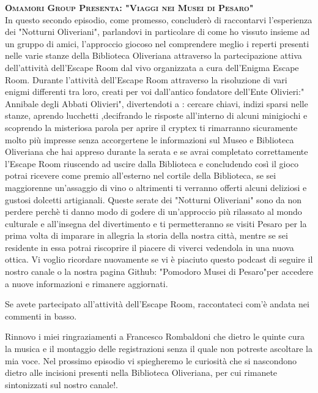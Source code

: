 \documentclass[hidelinks,12pt,a4paper]{article}
\begin{document}
\begin{flushleft}
		      \item{\scshape\bfseries Omamori Group Presenta: "Viaggi nei Musei di Pesaro"\\}
		      In questo secondo episodio, come promesso, concluderò di raccontarvi l'esperienza dei "Notturni Oliveriani", parlandovi in particolare di come ho vissuto insieme ad un gruppo di amici, l'approccio giocoso nel comprendere meglio i reperti presenti nelle varie stanze della Biblioteca Oliveriana attraverso la partecipazione attiva dell'attività dell'Escape Room dal vivo organizzata a cura dell'Enigma Escape Room.
		      Durante l'attività dell'Escape Room attraverso la risoluzione di vari enigmi differenti tra loro, creati per voi dall'antico fondatore dell'Ente Olivieri:" Annibale degli Abbati Olivieri", divertendoti a : cercare chiavi, indizi sparsi nelle stanze, aprendo lucchetti ,decifrando le risposte all'interno di alcuni minigiochi e scoprendo la misteriosa parola per aprire il cryptex ti rimarranno sicuramente molto più impresse senza accorgertene le informazioni sul Museo e Biblioteca Oliveriana che hai appreso durante la serata e se avrai completato correttamente l'Escape Room riuscendo ad uscire dalla Biblioteca e concludendo così il gioco potrai ricevere come premio all'esterno nel cortile della Biblioteca, se sei maggiorenne un'assaggio di vino o altrimenti ti verranno offerti alcuni deliziosi e gustosi dolcetti artigianali.
		      Queste serate dei "Notturni Oliveriani" sono da non perdere perchè ti danno modo di godere di un'approccio più rilassato al mondo culturale e all'insegna del divertimento e ti permetteranno se visiti Pesaro per la prima volta di imparare in allegria la storia della nostra città, mentre se sei residente in essa potrai riscoprire il piacere di viverci vedendola in una nuova ottica.
		      Vi voglio ricordare nuovamente se vi è piaciuto questo podcast di seguire il nostro canale o la nostra pagina Github: "Pomodoro Musei di Pesaro"per accedere a nuove informazioni e rimanere aggiornati.
		      
		      Se avete partecipato all'attività dell'Escape Room, raccontateci com'è andata nei commenti in basso.
		      
		      Rinnovo i miei ringraziamenti a Francesco Rombaldoni che dietro le quinte cura la musica e il montaggio delle registrazioni 
		      senza il quale non potreste ascoltare la mia voce.
		      Nel prossimo episodio vi spiegheremo le curiosità che si nascondono dietro alle incisioni presenti nella Biblioteca Oliveriana, per cui rimanete sintonizzati sul nostro canale!.
		\setcounter{page}{1}
		\newpage
		
		\tableofcontents
		\newpage
		
		
		
		\vspace*{\fill}
		\doclicenseThis
	\end{flushleft}
\end{document}

